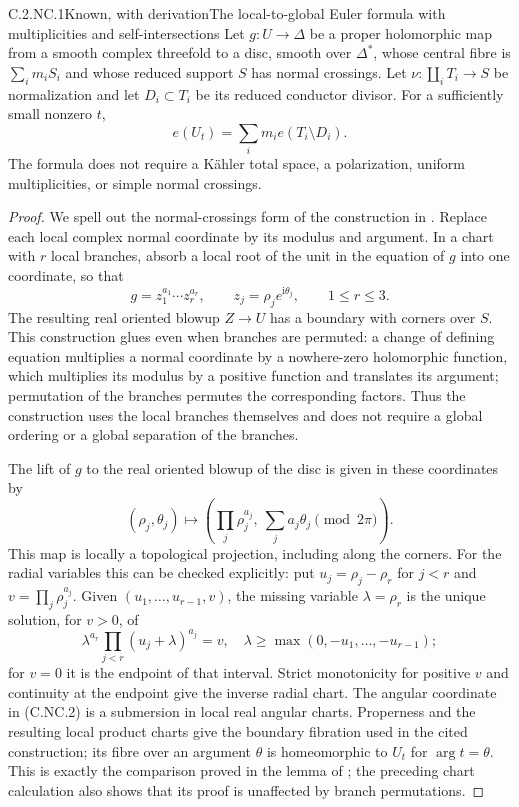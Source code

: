 \begin{statement}{C.2.NC.1}{Known, with derivation}{The local-to-global Euler formula with multiplicities and self-intersections}
Let $g:U\to\Delta$ be a proper holomorphic map from a smooth complex threefold to a disc, smooth over $\Delta^*$, whose central fibre is $\sum_i m_iS_i$ and whose reduced support $S$ has normal crossings. Let $\nu:\coprod_i T_i\to S$ be normalization and let $D_i\subset T_i$ be its reduced conductor divisor. For a sufficiently small nonzero $t$,
\[
 e(U_t)=\sum_i m_i e(T_i\setminus D_i).
 \tag{C.NC.1}
\]
The formula does not require a Kähler total space, a polarization, uniform multiplicities, or simple normal crossings.
\end{statement}
\begin{proof}
We spell out the normal-crossings form of the construction in \cite[\S2.1--2.2, pp.~237--241]{ACampo1975}. Replace each local complex normal coordinate by its modulus and argument. In a chart with $r$ local branches, absorb a local root of the unit in the equation of $g$ into one coordinate, so that
\[
 g=z_1^{a_1}\cdots z_r^{a_r},\qquad
 z_j=\rho_j e^{\mathrm i\theta_j},\qquad 1\le r\le3.
\]
The resulting real oriented blowup $Z\to U$ has a boundary with corners over $S$. This construction glues even when branches are permuted: a change of defining equation multiplies a normal coordinate by a nowhere-zero holomorphic function, which multiplies its modulus by a positive function and translates its argument; permutation of the branches permutes the corresponding factors. Thus the construction uses the local branches themselves and does not require a global ordering or a global separation of the branches.

The lift of $g$ to the real oriented blowup of the disc is given in these coordinates by
\[
 (\rho_j,\theta_j)\longmapsto
 \left(\prod_j\rho_j^{a_j},\ \sum_j a_j\theta_j\pmod {2\pi}\right).
 \tag{C.NC.2}
\]
This map is locally a topological projection, including along the corners. For the radial variables this can be checked explicitly: put $u_j=\rho_j-\rho_r$ for $j<r$ and $v=\prod_j\rho_j^{a_j}$. Given $(u_1,\ldots,u_{r-1},v)$, the missing variable $\lambda=\rho_r$ is the unique solution, for $v>0$, of
\[
 \lambda^{a_r}\prod_{j<r}(u_j+\lambda)^{a_j}=v,
 \quad \lambda\ge\max(0,-u_1,\ldots,-u_{r-1});
\]
for $v=0$ it is the endpoint of that interval. Strict monotonicity for positive $v$ and continuity at the endpoint give the inverse radial chart. The angular coordinate in (C.NC.2) is a submersion in local real angular charts. Properness and the resulting local product charts give the boundary fibration used in the cited construction; its fibre over an argument $\theta$ is homeomorphic to $U_t$ for $\arg t=\theta$. This is exactly the comparison proved in the lemma of \cite[\S2.2]{ACampo1975}; the preceding chart calculation also shows that its proof is unaffected by branch permutations.


\end{proof}
